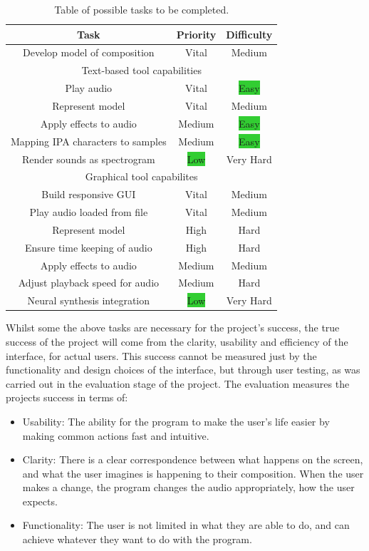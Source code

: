 \documentclass[12pt,a4paper,twoside,openright]{report}
\newcommand{\vital}{\colorbox{BrickRed}{Vital}}
\newcommand{\veryhard}{\colorbox{BrickRed}{Very Hard}}
\newcommand{\hard}{\colorbox{RedOrange}{Hard}}
\newcommand{\high}{\colorbox{RedOrange}{High}}
\newcommand{\medium}{\colorbox{Dandelion}{Medium}}
\newcommand{\low}{\colorbox{LimeGreen}{Low}}
\newcommand{\easy}{\colorbox{LimeGreen}{Easy}}
\begin{document}
\begin{table}[h]
    \centering
    \begin{tabular}{|c|c|c|}
        \hline
         Task & Priority & Difficulty \\
         \hline
         Develop model of composition & \vital & \medium \\
         \hline
         \multicolumn{3}{|c|}{Text-based tool capabilities} \\
         \hline
         Play audio & \vital & \easy \\
         Represent model & \vital & \medium \\
         Apply effects to audio & \medium & \easy \\
         Mapping IPA characters to samples & \medium & \easy \\
         Render sounds as spectrogram & \low & \veryhard \\
         \hline
         \multicolumn{3}{|c|}{Graphical tool capabilites} \\
         \hline
         Build responsive GUI & \vital & \medium \\
         Play audio loaded from file & \vital & \medium \\
         Represent model & \high & \hard \\
         Ensure time keeping of audio & \high & \hard \\
         Apply effects to audio & \medium & \medium \\
         Adjust playback speed for audio & \medium & \hard \\
         Neural synthesis integration & \low & \veryhard \\
         \hline
    \end{tabular}
    \caption{Table of possible tasks to be completed.}
    \label{tab:req_anal}
\end{table}

Whilst some the above tasks are necessary for the project's success, the true success of the project will come from the clarity, usability and efficiency of the interface, for actual users. This success cannot be measured just by the functionality and design choices of the interface, but through user testing, as was carried out in the evaluation stage of the project.  The evaluation measures the projects success in terms of:
\begin{itemize}
    \item Usability: The ability for the program to make the user's life easier by making common actions fast and intuitive.
    \item Clarity: There is a clear correspondence between what happens on the screen, and what the user imagines is happening to their composition. When the user makes a change, the program changes the audio appropriately, how the user expects.
    \item Functionality: The user is not limited in what they are able to do, and can achieve whatever they want to do with the program.
\end{itemize}
\end{document}
